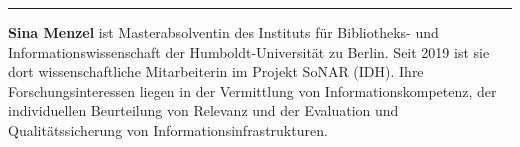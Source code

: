 \begin{center}\rule{0.5\linewidth}{0.5pt}\end{center}

\textbf{Sina Menzel} ist Masterabsolventin des Instituts für
Bibliotheks- und Informationswissenschaft der Humboldt-Universität zu
Berlin. Seit 2019 ist sie dort wissenschaftliche Mitarbeiterin im
Projekt SoNAR (IDH). Ihre Forschungsinteressen liegen in der Vermittlung
von Informationskompetenz, der individuellen Beurteilung von Relevanz
und der Evaluation und Qualitätssicherung von
Informationsinfrastrukturen.

